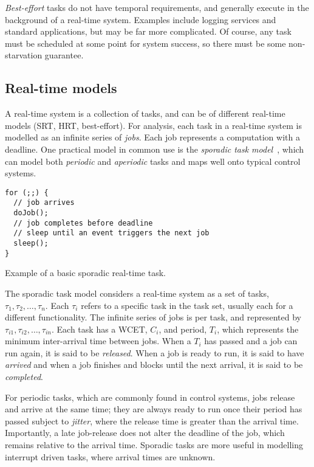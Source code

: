 \emph{Best-effort} tasks do not have temporal requirements, and generally execute in the
background of a real-time system. Examples include logging services and standard applications, but
may be far more complicated. Of course, any task must be scheduled at some point for system success,
so there must be some non-starvation guarantee. 

\subsection{Real-time models}

A real-time system is a collection of tasks, and can be of different real-time models (\gls{SRT},
\gls{HRT}, best-effort). 
For analysis, each task in a
real-time system is modelled as an infinite series of \emph{jobs}. Each job represents a computation
with a deadline. 
One practical model in common use is the \emph{sporadic task model}~\citep{Mok:phd}, which can
model both \emph{periodic} and \emph{aperiodic} tasks and maps well onto typical control systems. 

\begin{listing}
\begin{verbatim}
for (;;) {
  // job arrives
  doJob();
  // job completes before deadline
  // sleep until an event triggers the next job
  sleep();
}
\end{verbatim}
\caption{Example of a basic sporadic real-time task.}
\label{list:sporadic}
\end{listing}


The sporadic task model considers a real-time system as a set of tasks,
$\tau_{1},\tau_{2},\ldots,\tau_{n}$.
Each $\tau_{i}$ refers to a specific task in the task set, usually each for a different functionality.
The infinite series of jobs is per task, and represented by $\tau_{i1},\tau_{i2},\ldots,\tau_{in}$. Each task has
a \gls{WCET}, $C_{i}$, and period, $T_{i}$, which represents the minimum inter-arrival time
between jobs. When a $T_{i}$ has passed and a job can run again, it is said to be \emph{released}.
When a job is ready to run, it is said to have \emph{arrived} and when a job finishes and blocks until
the next arrival, it is said to be \emph{completed}. 

For periodic tasks, which are commonly found in control systems, jobs release and arrive at the same
time; they are always ready to run once their period has passed subject to \emph{jitter}, where the
release time is greater than the arrival time. Importantly, a late job-release does not alter the
deadline of the job, which remains relative to the arrival time. Sporadic tasks are more useful in
modelling interrupt driven tasks, where arrival times are unknown.


